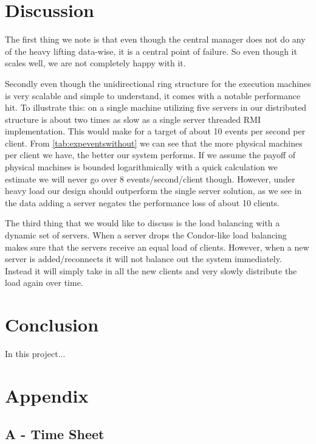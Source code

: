 \documentclass[a4paper,10pt]{article}
\begin{document}
\section{Discussion}
\label{sec:discussion}
The first thing we note is that even though the central manager does not do any of the heavy lifting data-wise, it is a central point of failure.
So even though it scales well, we are not completely happy with it.

Secondly even though the unidirectional ring structure for the execution machines is very scalable and simple to understand,
it comes with a notable performance hit.
To illustrate this: on a single machine utilizing five servers in our distributed structure is about two times as slow as a single server threaded RMI implementation.
This would make for a target of about 10 events per second per client.
From \autoref{tab:expeventswithout} we can see that the more physical machines per client we have, the better our system performs.
If we assume the payoff of physical machines is bounded logarithmically with a quick calculation we estimate we will never go over 8 events/second/client though.
However, under heavy load our design should outperform the single server solution, as we see in the data adding a server negates the performance
loss of about 10 clients.

The third thing that we would like to discuss is the load balancing with a dynamic set of servers.
When a server drops the Condor-like load balancing makes sure that the servers receive an equal load of clients.
However, when a new server is added/reconnects it will not balance out the system immediately.
Instead it will simply take in all the new clients and very slowly distribute the load again over time.

\section{Conclusion}
\label{sec:conclusion}
In this project...

\newpage
\section*{Appendix}

\subsection*{A - Time Sheet}
\label{sec:appendix}



\end{document}
